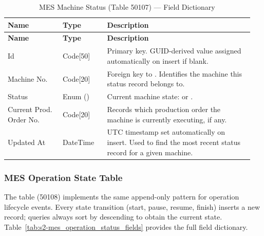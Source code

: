 \begin{longtable}{@{} P{0.21\linewidth} P{0.17\linewidth} P{0.57\linewidth} @{}}
  
  \caption{MES Machine Status (Table 50107) --- Field Dictionary}
  \label{tab:s2-mes_machine_status_fields}\\
  \toprule
  \textbf{Name}           & \textbf{Type}                      & \textbf{Description} \\
  \midrule
  \endfirsthead
  
  \toprule
  \textbf{Name}           & \textbf{Type}                      & \textbf{Description} \\
  \midrule
  \endhead
  
 
  
  \bottomrule
  \endlastfoot
  
  Id                      & Code[50]                           &                      
  Primary key. GUID-derived value assigned automatically on insert if blank. \\
  \midrule
  
  Machine No.             & Code[20]                           &                      
  Foreign key to . Identifies the machine this status
  record belongs to. \\
  \midrule
  
  Status                  & Enum () &                      
	Current machine state:  or . \\
  \midrule
  
  Current Prod. Order No. & Code[20]                           &                      
  Records which
  production order the machine is currently executing, if any. \\
  \midrule
  
  Updated At              & DateTime                           &                      
	UTC timestamp set automatically on insert. Used to find the most recent status
	record for a given machine. \\
  
\end{longtable}

\subsubsection*{MES Operation State Table}

The  table (50108) implements the same
append-only pattern for operation lifecycle events. Every state transition
(start, pause, resume, finish) inserts a new record; queries always sort by
 descending to obtain the current state.
Table~\ref{tab:s2-mes_operation_status_fields} provides the full field dictionary.

